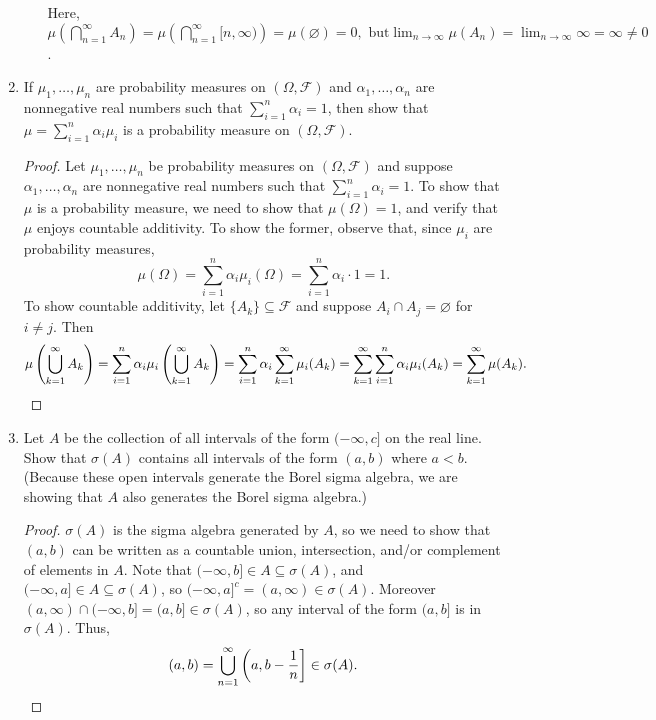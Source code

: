 \documentclass[11pt,oneside,english]{amsart}
\theoremstyle{definition}
\newcommand{\MC}[1]{\mathcal{#1}}
\newcommand{\1}{\mathbbm{1}}
\begin{document}
\begin{enumerate}[leftmargin=*]
\begin{enumerate}
Here, $\displaystyle \mu\left(\bigcap_{n=1}^\infty A_n\right)=\mu\left(\bigcap_{n=1}^\infty [n,\infty)\right)=\mu(\varnothing)=0,\text{ but} \lim_{n\to\infty}\mu(A_n)=\lim_{n\to\infty}\infty=\infty\neq0$.
\end{enumerate}

\pagebreak



\item If $\mu_1,\ldots,\mu_n$ are probability measures on $(\Omega,\MC{F})$ and $\alpha_1,\ldots,\alpha_n$ are nonnegative real numbers such that $\sum_{i=1}^n\alpha_i=1$, then show that $\mu=\sum_{i=1}^n\alpha_i\mu_i$ is a probability measure on $(\Omega,\MC{F})$.

\begin{proof}
Let $\mu_1,\ldots,\mu_n$ be probability measures on $(\Omega,\MC{F})$ and suppose $\alpha_1,\ldots,\alpha_n$ are nonnegative real numbers such that $\sum_{i=1}^n\alpha_i=1$. To show that $\mu$ is a probability measure, we need to show that $\mu(\Omega)=1$, and verify that $\mu$ enjoys countable additivity. To show the former, observe that, since $\mu_i$ are probability measures,
\[
\mu(\Omega)=\sum_{i=1}^n\alpha_i\mu_i(\Omega)=\sum_{i=1}^n\alpha_i\cdot1=1.
\]
To show countable additivity, let $\{A_k\}\subseteq\MC{F}$ and suppose $A_i\cap A_j=\varnothing$ for $i\neq j$. Then
\[
\mu\left(\bigcup_{k=1}^\infty A_k\right)=\sum_{i=1}^n\alpha_i\mu_i\left(\bigcup_{k=1}^\infty A_k\right)=\sum_{i=1}^n\alpha_i\sum_{k=1}^\infty\mu_i(A_k)=\sum_{k=1}^\infty\sum_{i=1}^n\alpha_i\mu_i(A_k)=\sum_{k=1}^\infty\mu(A_k).\qedhere
\]
\end{proof}


\item Let $A$ be the collection of all intervals of the form $(-\infty, c]$ on the real line. Show that $\sigma(A)$ contains all intervals of the form $(a,b)$ where $a<b$. (Because these open intervals generate the Borel sigma algebra, we are showing that $A$ also generates the Borel sigma algebra.)

\begin{proof}
$\sigma(A)$ is the sigma algebra generated by $A$, so we need to show that $(a,b)$ can be written as a countable union, intersection, and/or complement of elements in $A$. Note that $(-\infty,b]\in A\subseteq\sigma(A)$, and $(-\infty, a]\in A\subseteq\sigma(A)$, so $(-\infty,a]^c=(a,\infty)\in\sigma(A)$. Moreover $(a,\infty)\cap(-\infty,b]=(a,b]\in\sigma(A)$, so any interval of the form $(a,b]$ is in $\sigma(A)$. Thus,
\[
(a,b)=\bigcup_{n=1}^\infty\left(a,b-\frac{1}{n}\right]\in\sigma(A).\qedhere
\]
\end{proof}



\end{enumerate}
\end{document}
